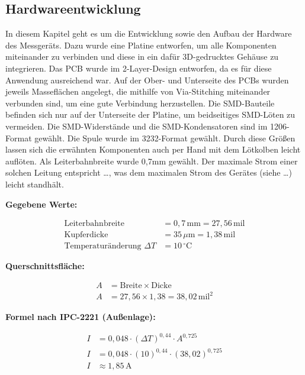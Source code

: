 \begin{inhalt}
\renewcommand*\chapterpagestyle{scrheadings}


\chapter{Hardwareentwicklung}

In diesem Kapitel geht es um die Entwicklung sowie den Aufbau der Hardware des Messgeräts. Dazu wurde eine Platine entworfen, um alle Komponenten miteinander zu verbinden und diese in ein dafür 3D-gedrucktes Gehäuse zu integrieren.
\smallskip
Das PCB wurde im 2-Layer-Design entworfen, da es für diese Anwendung ausreichend war.
Auf der Ober- und Unterseite des PCBs wurden jeweils Masseflächen angelegt, die mithilfe von Via-Stitching miteinander verbunden sind, um eine gute Verbindung herzustellen.
Die SMD-Bauteile befinden sich nur auf der Unterseite der Platine, um beidseitiges SMD-Löten zu vermeiden. Die SMD-Widerstände und die SMD-Kondensatoren sind im 1206-Format gewählt. Die Spule wurde im 3232-Format gewählt. Durch diese Größen lassen sich die erwähnten Komponenten auch per Hand mit dem Lötkolben leicht auflöten.
\newline
Als Leiterbahnbreite wurde 0,7mm gewählt. Der maximale Strom einer solchen Leitung entspricht …, was dem maximalen Strom des Gerätes (siehe …) leicht standhält.

\smallskip

\textbf{Gegebene Werte:}

\begin{align*}
\text{Leiterbahnbreite} &= 0{,}7\,\text{mm} = 27{,}56\,\text{mil} \\
\text{Kupferdicke} &= 35\,\mu\text{m} = 1{,}38\,\text{mil} \\
\text{Temperaturänderung } \Delta T &= 10\,^\circ\text{C}
\end{align*}



\vspace{1em}
\textbf{Querschnittsfläche:}

\begin{align*}
A &= \text{Breite} \times \text{Dicke} \\
A &= 27{,}56 \times 1{,}38 = 38{,}02\,\text{mil}^2
\end{align*}

\vspace{1em}
\textbf{Formel nach IPC-2221 (Außenlage):}

\begin{align*}
I &= 0{,}048 \cdot (\Delta T)^{0{,}44} \cdot A^{0{,}725} \\
I &= 0{,}048 \cdot (10)^{0{,}44} \cdot (38{,}02)^{0{,}725} \\
I &\approx 1{,}85\,\text{A}
\end{align*}


\end{inhalt}
